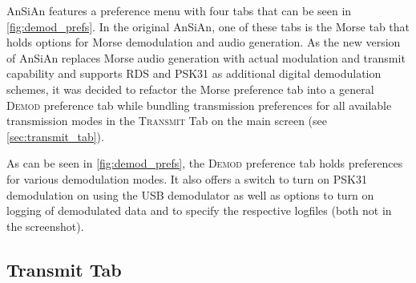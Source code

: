 \ac{AnSiAn} features a preference menu with four tabs that can be seen in \autoref{fig:demod_prefs}. In the original \ac{AnSiAn}, one of these tabs is the Morse tab that holds options for Morse demodulation and audio generation. As the new version of \ac{AnSiAn} replaces Morse audio generation with actual modulation and transmit capability and supports \ac{RDS} and \ac{PSK31} as additional digital demodulation schemes, it was decided to refactor the Morse preference tab into a general \textsc{Demod} preference tab while bundling transmission preferences for all available transmission modes in the \textsc{Transmit} Tab on the main screen (see \autoref{sec:transmit_tab}).

As can be seen in \autoref{fig:demod_prefs}, the \textsc{Demod} preference tab holds preferences for various demodulation modes. It also offers a switch to turn on \ac{PSK31} demodulation on using the \ac{USB} demodulator as well as options to turn on logging of demodulated data and to specify the respective logfiles (both not in the screenshot). 

\subsection{Transmit Tab\label{sec:transmit_tab}}

